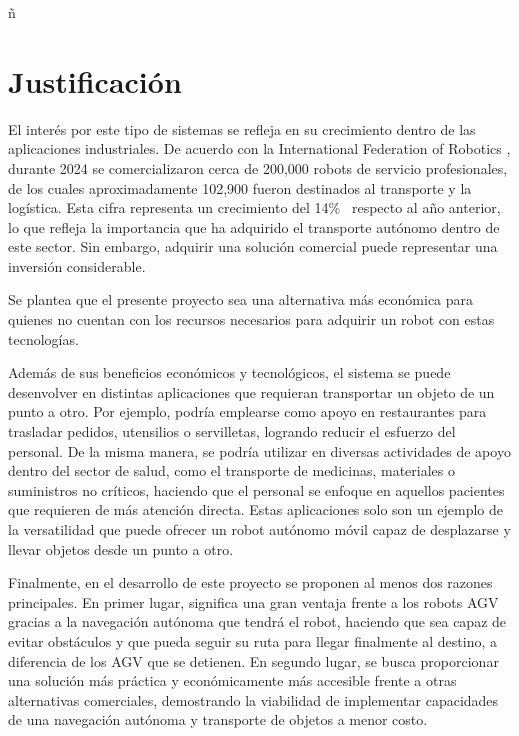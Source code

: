 ñ%

\chapter{Justificación}
\label{cap:justificacion}
El interés por este tipo de sistemas se refleja en su crecimiento dentro de las aplicaciones industriales. De acuerdo con la International Federation of Robotics \cite{J3}, durante 2024 se comercializaron cerca de 200,000 robots de servicio profesionales, de los cuales aproximadamente 102,900 fueron destinados al transporte y la logística. Esta cifra representa un crecimiento del 14\% \  respecto al año anterior, lo que refleja la importancia que ha adquirido el transporte autónomo dentro de este sector. Sin embargo, adquirir una solución comercial puede representar una inversión considerable.

Se plantea que el presente proyecto sea una alternativa más económica para quienes no cuentan con los recursos necesarios para adquirir un robot con estas tecnologías.

Además de sus beneficios económicos y tecnológicos, el sistema se puede desenvolver en distintas aplicaciones que requieran transportar un objeto de un punto a otro. Por ejemplo, podría emplearse como apoyo en restaurantes para trasladar pedidos, utensilios o servilletas, logrando reducir el esfuerzo del personal. De la misma manera, se podría utilizar en diversas actividades de apoyo dentro del sector de salud, como el transporte de medicinas, materiales o suministros no críticos, haciendo que el personal se enfoque en aquellos pacientes que requieren de más atención directa. Estas aplicaciones solo son un ejemplo de la versatilidad que puede ofrecer un robot autónomo móvil capaz de desplazarse y llevar objetos desde un punto a otro.

Finalmente, en el desarrollo de este proyecto se proponen al menos dos razones principales. En primer lugar, significa una gran ventaja frente a los robots AGV gracias a la navegación autónoma que tendrá el robot, haciendo que sea capaz de evitar obstáculos y que pueda seguir su ruta para llegar finalmente al destino, a diferencia de los AGV que se detienen.  En segundo lugar, se busca proporcionar una solución más práctica y económicamente más accesible frente a otras alternativas comerciales, demostrando la viabilidad de implementar capacidades de una navegación autónoma y transporte de objetos a menor costo.


\noindent